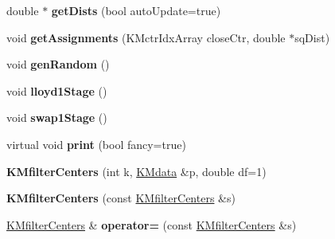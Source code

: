 \begin{DoxyCompactItemize}
\item 
\hypertarget{class_k_mfilter_centers_aeffb7d56a249f656c6598c905fe53c5b}{
double $\ast$ {\bfseries getDists} (bool autoUpdate=true)}
\label{class_k_mfilter_centers_aeffb7d56a249f656c6598c905fe53c5b}

\item 
\hypertarget{class_k_mfilter_centers_a571cb3d1631b7b2c468db877baf66a5c}{
void {\bfseries getAssignments} (KMctrIdxArray closeCtr, double $\ast$sqDist)}
\label{class_k_mfilter_centers_a571cb3d1631b7b2c468db877baf66a5c}

\item 
\hypertarget{class_k_mfilter_centers_abb36f5d2f10f53056a561ec51db67ba7}{
void {\bfseries genRandom} ()}
\label{class_k_mfilter_centers_abb36f5d2f10f53056a561ec51db67ba7}

\item 
\hypertarget{class_k_mfilter_centers_a9c8991539aff906c3b54dffeb7b3b62d}{
void {\bfseries lloyd1Stage} ()}
\label{class_k_mfilter_centers_a9c8991539aff906c3b54dffeb7b3b62d}

\item 
\hypertarget{class_k_mfilter_centers_a14f46a46a2cc5adc6e2fbdc36221fd88}{
void {\bfseries swap1Stage} ()}
\label{class_k_mfilter_centers_a14f46a46a2cc5adc6e2fbdc36221fd88}

\item 
\hypertarget{class_k_mfilter_centers_ab4bc93ad0a82602db4334c81f88ec148}{
virtual void {\bfseries print} (bool fancy=true)}
\label{class_k_mfilter_centers_ab4bc93ad0a82602db4334c81f88ec148}

\item 
\hypertarget{class_k_mfilter_centers_af4430cb3cbc82ee0c08f837748f59bdb}{
{\bfseries KMfilterCenters} (int k, \hyperlink{class_k_mdata}{KMdata} \&p, double df=1)}
\label{class_k_mfilter_centers_af4430cb3cbc82ee0c08f837748f59bdb}

\item 
\hypertarget{class_k_mfilter_centers_a2c7cbf025c94dcda95983c624529d5c6}{
{\bfseries KMfilterCenters} (const \hyperlink{class_k_mfilter_centers}{KMfilterCenters} \&s)}
\label{class_k_mfilter_centers_a2c7cbf025c94dcda95983c624529d5c6}

\item 
\hypertarget{class_k_mfilter_centers_a2e467124992086e0fde742f3127ff3a7}{
\hyperlink{class_k_mfilter_centers}{KMfilterCenters} \& {\bfseries operator=} (const \hyperlink{class_k_mfilter_centers}{KMfilterCenters} \&s)}
\label{class_k_mfilter_centers_a2e467124992086e0fde742f3127ff3a7}


\end{DoxyCompactItemize}
